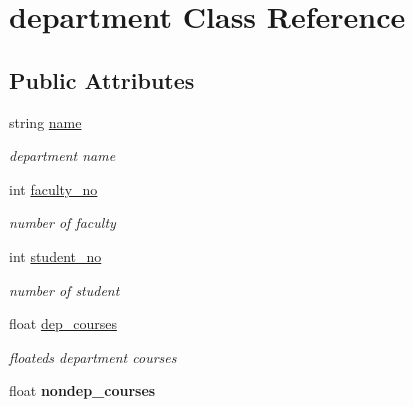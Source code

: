 \hypertarget{classdepartment}{\section{department \-Class \-Reference}
\label{classdepartment}
}
\subsection*{\-Public \-Attributes}
\begin{DoxyCompactItemize}
\item 
\hypertarget{classdepartment_aaba01f076fa58a590448604a5dfd9954}{string \hyperlink{classdepartment_aaba01f076fa58a590448604a5dfd9954}{name}}\label{classdepartment_aaba01f076fa58a590448604a5dfd9954}

\begin{DoxyCompactList}\small\item\em department name \end{DoxyCompactList}\item 
\hypertarget{classdepartment_a0226292341be466384287a189fe30c6e}{int \hyperlink{classdepartment_a0226292341be466384287a189fe30c6e}{faculty\-\_\-no}}\label{classdepartment_a0226292341be466384287a189fe30c6e}

\begin{DoxyCompactList}\small\item\em number of faculty \end{DoxyCompactList}\item 
\hypertarget{classdepartment_afdf16dfe1aa40a624fc27ddeacf1d7f8}{int \hyperlink{classdepartment_afdf16dfe1aa40a624fc27ddeacf1d7f8}{student\-\_\-no}}\label{classdepartment_afdf16dfe1aa40a624fc27ddeacf1d7f8}

\begin{DoxyCompactList}\small\item\em number of student \end{DoxyCompactList}\item 
\hypertarget{classdepartment_ac25e029f20208896a05d97eb75d46c47}{float \hyperlink{classdepartment_ac25e029f20208896a05d97eb75d46c47}{dep\-\_\-courses}}\label{classdepartment_ac25e029f20208896a05d97eb75d46c47}

\begin{DoxyCompactList}\small\item\em floateds department courses \end{DoxyCompactList}\item 
\hypertarget{classdepartment_a9558d2f01c3b9a94772c868b47c61448}{float {\bfseries nondep\-\_\-courses}}\label{classdepartment_a9558d2f01c3b9a94772c868b47c61448}


\end{DoxyCompactItemize}

